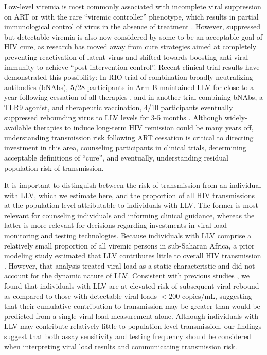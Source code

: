 \documentclass{article}[11pt]
\begin{document}
Low-level viremia is most commonly associated with incomplete viral suppression on ART or with the rare ``viremic controller'' phenotype, which results in partial immunological control of virus in the absence of treatment \cite{okulicz_clinical_2009, kwaa_immune_2024}. However, suppressed but detectable viremia is also now considered by some to be an acceptable goal of HIV cure, as research has moved away from cure strategies aimed at completely preventing reactivation of latent virus and shifted towards boosting anti-viral immunity to achieve ``post-intervention control''\cite{gunst_time_2025, wagner_advances_2026}. Recent clinical trial results have demonstrated this possibility: In RIO trial of combination broadly neutralizing antibodies (bNAbs), 5/28 participants in Arm B maintained LLV for close to a year following cessation of all therapies \cite{edgar_abstract_2026}, and in another trial combining bNAbs, a TLR9 agonist, and therapeutic vaccination, 4/10 participants eventually suppressed rebounding virus to LLV levels for 3-5 months \cite{peluso_correlates_2026}. 
Although widely-available therapies to induce long-term HIV remission could be many years off, understanding transmission risk following ART cessation is critical to directing investment in this area, counseling participants in clinical trials, determining acceptable definitions of ``cure'', and eventually, understanding residual population risk of transmission. 

It is important to distinguish between the risk of transmission from an individual with LLV, which we estimate here, and the proportion of all HIV transmissions at the population level attributable to individuals with LLV. The former is most relevant for counseling individuals and informing clinical guidance, whereas the latter is more relevant for decisions regarding investments in viral load monitoring and testing technologies. Because individuals with LLV comprise a relatively small proportion of all viremic persons in sub-Saharan Africa, a prior modeling study estimated that LLV contributes little to overall HIV transmission \cite{larmarange2023}. However, that analysis treated viral load as a static characteristic and did not account for the dynamic nature of LLV. Consistent with previous studies \cite{nzivo2023, antiretroviraltherapycohort2015, laprise2013, fleming2019}, we found that individuals with LLV are at elevated risk of subsequent viral rebound as compared to those with detectable viral loads $<200$ copies/mL, suggesting that their cumulative contribution to transmission may be greater than would be predicted from a single viral load measurement alone. Although individuals with LLV may contribute relatively little to population-level transmission, our findings suggest that both assay sensitivity and testing frequency should be considered when interpreting viral load results and communicating transmission risk.
\end{document}
